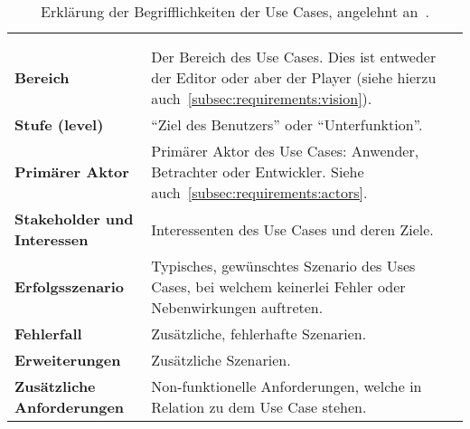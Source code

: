 
\begin{longtabu}{p{0.3\textwidth}p{0.7\textwidth}}
    \centering\\
    \caption{Erklärung der Begrifflichkeiten der Use
        Cases, angelehnt an~\cite[S.
        67]{larman_applying_2004}.}\label{table:uc-explanation}\\
    \toprule
        \textbf{Bereich} &
        Der Bereich des Use Cases. Dies ist entweder der Editor oder aber der
        Player (siehe hierzu auch~\autoref{subsec:requirements:vision}).\\
    \cmidrule(r){1-1}\cmidrule(lr){2-2}
        \textbf{Stufe (level)} &
        ``Ziel des Benutzers'' oder ``Unterfunktion''.\\
    \cmidrule(r){1-1}\cmidrule(lr){2-2}
        \textbf{Primärer Aktor} &
        Primärer Aktor des Use Cases: Anwender, Betrachter oder Entwickler.
        Siehe auch~\autoref{subsec:requirements:actors}. \\
    \cmidrule(r){1-1}\cmidrule(lr){2-2}
        \textbf{Stakeholder und Interessen} &
        Interessenten des Use Cases und deren Ziele.\\
    \cmidrule(r){1-1}\cmidrule(lr){2-2}
        \textbf{Erfolgsszenario} &
        Typisches, gewünschtes Szenario des Uses Cases, bei welchem keinerlei
        Fehler oder Nebenwirkungen auftreten.\\
    \cmidrule(r){1-1}\cmidrule(lr){2-2}
        \textbf{Fehlerfall} &
        Zusätzliche, fehlerhafte Szenarien.\\
    \cmidrule(r){1-1}\cmidrule(lr){2-2}
        \textbf{Erweiterungen} &
        Zusätzliche Szenarien.\\
    \cmidrule(r){1-1}\cmidrule(lr){2-2}
        \textbf{Zusätzliche Anforderungen} &
        Non-funktionelle Anforderungen, welche in Relation zu dem Use Case
        stehen.\\
    \bottomrule
\end{longtabu}
